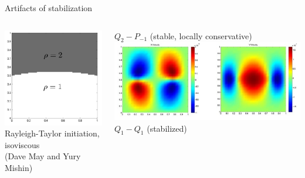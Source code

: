 \begin{frame}{Artifacts of stabilization}
  \begin{columns}
    \begin{column}{0.4\textwidth}
      \includegraphics[width=\textwidth]{figures/Stabilization/RayleighTaylor} \\
      Rayleigh-Taylor initiation, isoviscous \\
      (Dave May and Yury Mishin)
    \end{column}
    \begin{column}{0.6\textwidth}
      $Q_2-P_{-1}$ (stable, locally conservative) \\
        \includegraphics[width=\textwidth]{figures/Stabilization/Q2Pm1} \\
        \medskip
        $Q_1-Q_1$ (stabilized) \\

\end{column}
\end{columns}
\end{frame}
